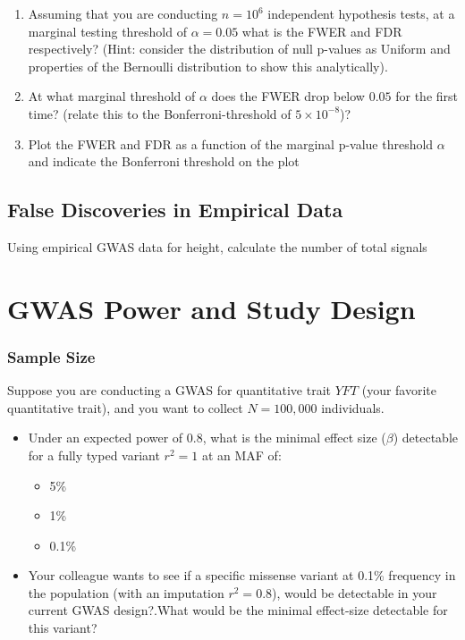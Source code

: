 \documentclass{pset}
\begin{document}
\begin{enumerate}
\item Assuming that you are conducting $n=10^6$ independent hypothesis tests, at a marginal testing threshold of $\alpha = 0.05$ what is the FWER and FDR respectively?  (Hint: consider the distribution of null p-values as Uniform and properties of the Bernoulli distribution to show this analytically).

\item At what marginal threshold of $\alpha$ does the FWER drop below $0.05$ for the first time? (relate this to the Bonferroni-threshold of $5\times 10^{-8}$)? 
\item Plot the FWER and FDR as a function of the marginal p-value threshold $\alpha$ and indicate the Bonferroni threshold on the plot

\end{enumerate}

\subsection*{False Discoveries in Empirical Data}

Using empirical GWAS data for height, calculate the number of total signals 

\section*{GWAS Power and Study Design}

\subsubsection*{Sample Size}

Suppose you are conducting a GWAS for quantitative trait $YFT$ (your favorite quantitative trait), and you want to collect $N=100,000$ individuals. 

\begin{itemize}
	\item Under an expected power of 0.8, what is the minimal effect size ($\beta$) detectable for a fully typed variant $r^2 = 1$ at an MAF of: 
	\begin{itemize}
		\item 5\% 
		\item 1\%
		\item 0.1\%
	\end{itemize}
	\item Your colleague wants to see if a specific missense variant at 0.1\% frequency in the population (with an imputation $r^2 = 0.8$), would be detectable in your current GWAS design?.What would be the minimal effect-size detectable for this variant?  
\end{itemize}
\end{document}

